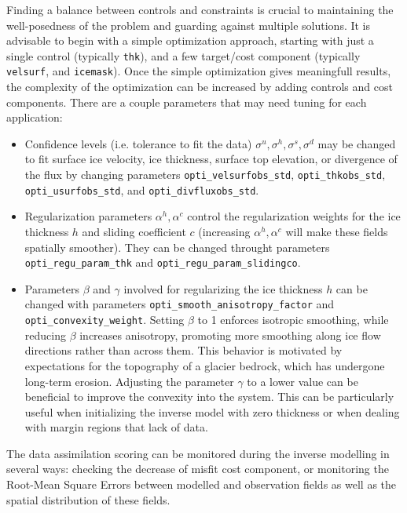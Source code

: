\documentclass[10pt,twocolumn]{article}
\begin{document}
Finding a balance between controls and constraints is crucial to maintaining the 
well-posedness of the problem and guarding against multiple solutions. It is advisable 
to begin with a simple optimization approach, starting with just a single control
(typically \texttt{thk}), and a few target/cost component (typically \texttt{velsurf},
and \texttt{icemask}). Once the simple optimization gives meaningfull results,
the complexity of the optimization can be increased by adding controls and cost components. 
There are a couple parameters that may need tuning for each application:
\begin{itemize}
\item Confidence levels (i.e. tolerance to fit the data) $\sigma^u, \sigma^h, \sigma^s, \sigma^d$ 
may be changed to fit surface ice velocity, ice thickness, surface top elevation, or divergence 
of the flux by changing parameters \texttt{opti\_velsurfobs\_std}, \texttt{opti\_thkobs\_std},
\texttt{opti\_usurfobs\_std}, and \texttt{opti\_divfluxobs\_std}. 
\item Regularization parameters $\alpha^h, \alpha^c$ control the regularization weights 
for the ice thickness $h$ and sliding coefficient $c$ (increasing $\alpha^h, \alpha^c$ 
will make these fields spatially smoother). They can be changed throught parameters 
\texttt{opti\_regu\_param\_thk} and \texttt{opti\_regu\_param\_slidingco}.
\item Parameters $\beta$ and $\gamma$ involved for regularizing the ice thickness $h$
can be changed with parameters \texttt{opti\_smooth\_anisotropy\_factor} 
and \texttt{opti\_convexity\_weight}.
Setting $\beta$ to 1 enforces isotropic smoothing, while reducing $\beta$ increases anisotropy, 
promoting more smoothing along ice flow directions rather than across them. 
This behavior is motivated by expectations for the topography of a glacier bedrock, 
which has undergone long-term erosion.
Adjusting the parameter $\gamma$ to a lower value can be beneficial to improve
the convexity into the system. This can be particularly useful when initializing 
the inverse model with zero thickness or when dealing with margin regions that lack of data.
\end{itemize}

The data assimilation scoring can be monitored during the inverse modelling in several ways:
checking the decrease of misfit cost component, or monitoring the Root-Mean Square Errors between
modelled and observation fields as well as the spatial distribution of these fields.
 
\end{document}
